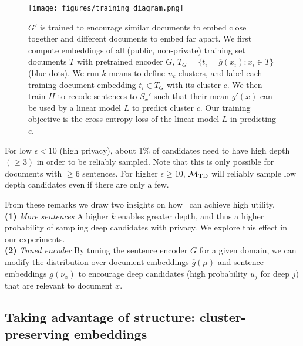\begin{figure}
	\centering
	\texttt{[image: figures/training\_diagram.png]} 
	\vspace{-0.65cm}
	\caption[$G'$ is trained to encourage similar documents to embed close together and different documents to embed far apart. ]{$G'$ is trained to encourage similar documents to embed close together and different documents to embed far apart. We first compute embeddings of all (public, non-private) training set documents $T$ with pretrained encoder $G$, $T_G = \{t_i = \overline{g}(x_i) : x_i \in T\}$ (blue dots). We run $k$-means to define $n_c$ clusters, and label each training document embedding $t_i \in T_G$ with its cluster $c$. We then train $H$ to recode sentences to $S_x'$ such that their mean $\overline{g}'(x)$ can be used by a linear model $L$ to predict cluster $c$. Our training objective is the cross-entropy loss of the linear model $L$ in predicting $c$.}
	\label{fig:training diagram}
	\vspace{-0.4cm}
\end{figure}

For low $\epsilon < 10$ (high privacy), about 1\% of candidates need to have high depth $(\geq 3)$ in order to be reliably sampled. Note that this is only possible for documents with $\geq 6$ sentences. For higher $\epsilon \geq 10$, $\mathcal{M}_{\text{TD}}$ will reliably sample low depth candidates even if there are only a few. 
 
From these remarks we draw two insights on how \technique\ can achieve high utility.\\
\textbf{(1)} \emph{More sentences} A higher $k$ enables greater depth, and thus a higher probability of sampling deep candidates with privacy. We explore this effect in our experiments. \\
\textbf{(2)} \emph{ Tuned encoder} By tuning the sentence encoder $G$ for a given domain, we can modify the distribution over document embeddings $\overline{g}(\mu)$ and sentence embeddings $g(\nu_x)$ to encourage deep candidates (high probability $u_j$ for deep $j$) that are relevant to document $x$.



\subsection{Taking advantage of structure: cluster-preserving embeddings}

